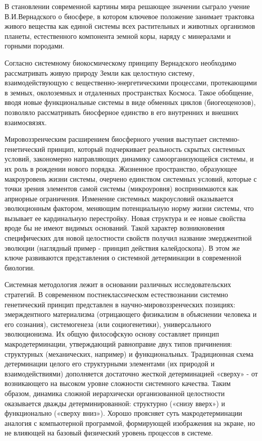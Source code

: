 \documentclass[exam_answers.tex]{subfiles}
\begin{document}
В становлении современной картины мира решающее значении сыграло
учение В.И.Вернадского о биосфере, в котором ключевое положение занимает
трактовка живого вещества как единой системы всех растительных и
животных организмов планеты, естественного компонента земной коры,
наряду с минералами и горными породами.

Согласно системному биокосмическому принципу Вернадского
необходимо рассматривать живую природу Земли как целостную систему,
взаимодействующую с вещественно-энергетическими процессами,
протекающими в земных, околоземных и отдаленных пространствах Космоса.
Такое обобщение, вводя новые функциональные системы в виде обменных
циклов (биогеоценозов), позволяло рассматривать биосферное единство в его
внутренних и внешних взаимосвязях. 

Мировоззренческим расширением биосферного учения выступает
системно-генетический принцип, который подчеркивает реальность скрытых
системных условий, закономерно направляющих динамику
самоорганизующейся системы, и их роль в рождении нового порядка.
Жизненное пространство, образующее макроуровень жизни системы, очерчено
единством системных условий, которые с точки зрения элементов самой
системы (микроуровня) воспринимаются как априорные ограничения.
Изменение системных макроусловий оказывается эволюционным фактором,
меняющим потенциальную норму жизни системы, что вызывает ее
кардинальную перестройку. Новая структура и ее новые свойства вроде бы не
имеют видимых оснований. Такой характер возникновения специфических для
новой целостности свойств получил название эмерджентной эволюции
(наглядный пример - принцип действия калейдоскопа). В этом же ключе
развиваются представления о системной детерминации в современной
биологии. 

Системная методология лежит в основании различных исследовательских
стратегий. В современном постнеклассическом естествознании системно
генетический принцип представлен в научно-мировоззренческих позициях:
эмерждентного материализма
(отрицающего физикализм в объяснении
человека и его сознания), системогенеза (или социогенетики),
универсального эволюционизма.
Их общую философскую основу составляет принцип
макродетерминации, утверждающий равноправие двух типов причинения:
структурных (механических, например) и функциональных. Традиционная
схема детерминации целого его структурными элементами (их природой и
взаимодействиями) дополняется достаточно жесткой детерминацией «сверху» -
от возникающего на высоком уровне сложности системного качества. Таким
образом, динамика сложной иерархически организованной целостности
оказывается дважды детерминированной: структурно («снизу вверх») и
функционально («сверху вниз»).
 Хорошо проясняет суть макродетерминации
аналогия с компьютерной программой, формирующей изображения на экране,
но не влияющей на базовый физический уровень процессов в системе.
\end{document}
